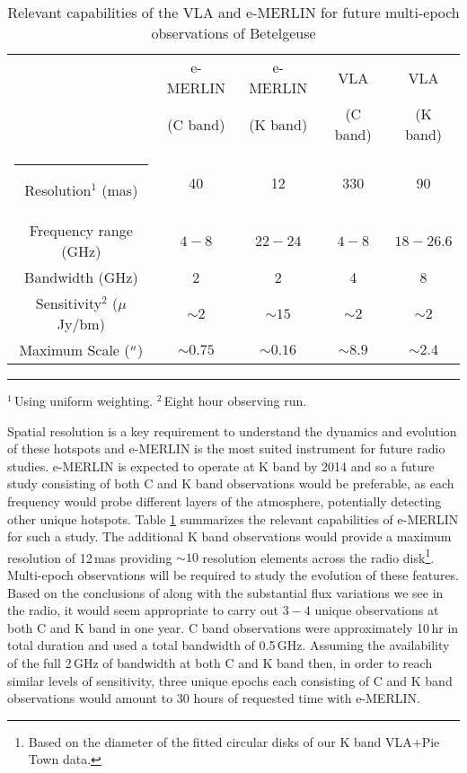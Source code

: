 \begin{table}[hb]
\begin{center}
\caption[Relevant Capabilities of the VLA and e-MERLIN]{Relevant capabilities of the VLA and e-MERLIN for future multi-epoch observations of Betelgeuse}
\begin{tabular}{ccccc}
\hline
\hline
\rule{0pt}{2.5ex}  & e-MERLIN  & e-MERLIN & VLA  & VLA \\
\rule{0pt}{2.5ex}  & (C band) & (K band) & (C band) & (K band)\\
\hline
\rule{-2.5pt}{2.5ex}	Resolution$^{1}$ (mas) &  40 & 12 & 330&90\\
					Frequency range (GHz) &  $4-8$ & $22-24$ & $4-8$&$18-26.6$\\
					Bandwidth (GHz) &  2& 2 & 4&8\\
					Sensitivity$^{2}$ ($\mu$ Jy/bm) & $\sim 2$ & $\sim 15$&$\sim 2$&$\sim 2$\\
					Maximum Scale ($^{\prime\prime}$) & $\sim 0.75$ & $\sim 0.16$&$\sim 8.9$&$\sim 2.4$\\
\hline
\end{tabular}
\label{tab:8.1}
\begin{minipage}{12.5cm}
\rule{-2.5pt}{2.5ex}{\footnotesize $^{1}$\,Using uniform weighting. $^{2}$\,Eight hour observing run.}
\end{minipage}
\end{center}
\end{table}

Spatial resolution is a key requirement to understand the dynamics and evolution of these hotspots and e-MERLIN is the most suited instrument for future radio studies. e-MERLIN is expected to operate at K band by 2014 and so a future study consisting of both C and K band observations would be preferable, as each frequency would probe different layers of the atmosphere, potentially detecting other unique hotspots. Table \ref{tab:8.1} summarizes the relevant capabilities of e-MERLIN for such a study. The additional K band observations would provide a maximum resolution of 12\,mas providing $\sim 10$ resolution elements across the radio disk\footnote{Based on the diameter of the fitted circular disks of our K band VLA+Pie Town data.}. Multi-epoch observations will be required to study the evolution of these features. Based on the conclusions of \cite{ohnaka_2011} along with the substantial flux variations we see in the radio, it would seem appropriate to carry out $3-4$ unique observations at both C and K band in one year. \cite{richards_2013}  C band observations were approximately 10\,hr in total duration and used a total bandwidth of 0.5\,GHz. Assuming the availability of the full 2\,GHz of bandwidth at both C and K band then, in order to reach similar levels of sensitivity, three unique epochs each consisting of C and K band observations would amount to 30 hours of requested time with e-MERLIN.

